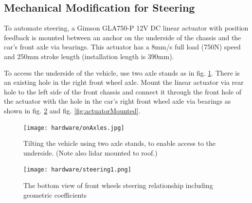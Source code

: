 \documentclass[a4paper]{article}
\begin{document}



\subsection{Mechanical Modification for Steering}

To automate steering, a Gimson GLA750-P 12V DC linear actuator with position feedback is mounted between an anchor on the underside of the chassis and the car's front axle via bearings.  This actuator has a 8mm/s full load (750N) speed and 250mm stroke length (installation length is 390mm).  

To access the underside of the vehicle, use two axle stands as in fig. \ref{fig:axelStands}. There is an existing hole in the right front wheel axle.  Mount the linear actuator via rear hole to the left side of the front chassis and connect it through the front hole of the actuator with the hole in the car's right front wheel axle via bearings as shown in fig. \ref{fig:steering} and fig. \ref{fig:actuatorMounted}.

\begin{figure}[h]
	\texttt{[image: hardware/onAxles.jpg]}
	\caption{Tilting the vehicle using two axle stands, to enable access to the underside. (Note also lidar mounted to roof.)}
	\label{fig:axelStands}
\end{figure}

\begin{figure}[h]
	\texttt{[image: hardware/steering1.png]}
	\caption{The bottom view of front wheels steering relationship including geometric coefficients}
	\label{fig:steering}
\end{figure}
\end{document}
